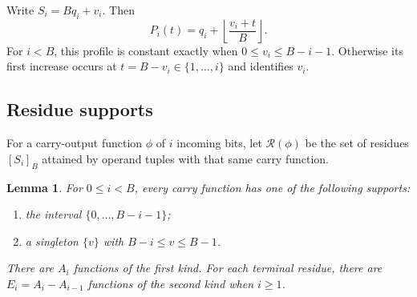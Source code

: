 \documentclass[11pt,a4paper]{article}
\newtheorem{lemma}[theorem]{Lemma}
\theoremstyle{definition}\newtheorem{definition}[theorem]{Definition}
\newcommand{\supp}{\mathcal R}
\begin{document}
Write $S_i=Bq_i+v_i$. Then
\begin{equation}\label{eq:profile-form}
 P_i(t)=q_i+\left\lfloor\frac{v_i+t}{B}\right\rfloor.
\end{equation}
For $i<B$, this profile is constant exactly when
$0\leq v_i\leq B-i-1$. Otherwise its first increase occurs at
$t=B-v_i\in\{1,\ldots,i\}$ and identifies $v_i$.

\subsection{Residue supports}
For a carry-output function $\phi$ of $i$ incoming bits, let
$\supp(\phi)$ be the set of residues $[S_i]_B$ attained by operand tuples
with that same carry function.

\begin{lemma}\label{lem:support}
For $0\leq i<B$, every carry function has one of the following supports:
\begin{enumerate}
\item the interval $\{0,\ldots,B-i-1\}$;
\item a singleton $\{v\}$ with $B-i\leq v\leq B-1$.
\end{enumerate}
There are $A_i$ functions of the first kind. For each terminal residue,
there are $E_i=A_i-A_{i-1}$ functions of the second kind when $i\geq1$.
\end{lemma}
\end{document}
